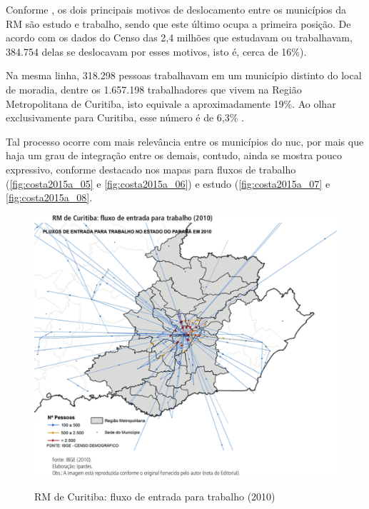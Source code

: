 	Conforme , os dois principais motivos de deslocamento entre os municípios da RM são estudo e trabalho, sendo que este último ocupa a primeira posição. De acordo com os dados do Censo das 2,4 milhões que estudavam ou trabalhavam, 384.754 delas se deslocavam por esses motivos, isto é, cerca de 16\%).
	
	Na mesma linha, 318.298 pessoas trabalhavam em um município distinto do local de moradia, dentre os 1.657.198 trabalhadores que vivem na Região Metropolitana de Curitiba, isto equivale a aproximadamente 19\%. Ao olhar exclusivamente para Curitiba, esse número é de 6,3\% .
	
	Tal processo ocorre com mais relevância entre os municípios do \gls{nuc}, por mais que haja um grau de integração entre os demais, contudo, ainda se mostra pouco expressivo, conforme destacado nos mapas para fluxos de trabalho (\autoref{fig:costa2015a_05} e \autoref{fig:costa2015a_06}) e estudo (\autoref{fig:costa2015a_07} e \autoref{fig:costa2015a_08}.
	
	\begin{figure}
		\centering
		\caption{RM de Curitiba: fluxo de entrada para trabalho (2010)}
		\includegraphics[width=1.0\linewidth]{img/costa2015a_05}
		\label{fig:costa2015a_05}
	\end{figure}

